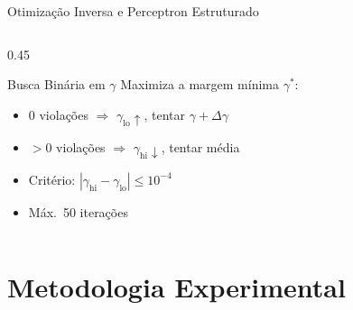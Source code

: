 \documentclass[aspectratio=169, 8pt]{beamer}
\begin{document}
\begin{frame}{Otimização Inversa e Perceptron Estruturado}
\begin{columns}[T]
\begin{column}{0.45\textwidth}
      \vspace{0.1em}
      \begin{alertblock}{Busca Binária em $\gamma$}
        Maximiza a margem mínima $\gamma^*$:
        \begin{itemize}
          \scriptsize
          \item 0 violações $\Rightarrow$ $\gamma_{\text{lo}} \uparrow$, tentar $\gamma + \Delta\gamma$
          \item $>$0 violações $\Rightarrow$ $\gamma_{\text{hi}} \downarrow$, tentar média
          \item Critério: $|\gamma_{\text{hi}} - \gamma_{\text{lo}}| \leq 10^{-4}$
          \item Máx.\ 50 iterações
        \end{itemize}
      \end{alertblock}
    \end{column}
  \end{columns}
\end{frame}

\section{Metodologia Experimental}
\end{document}
